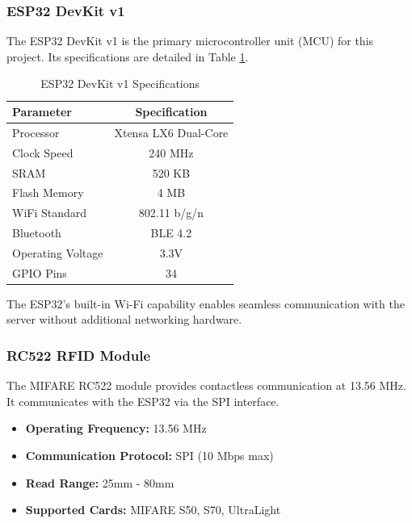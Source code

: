 \documentclass[12pt,a4paper]{article}
\begin{document}
\subsubsection{ESP32 DevKit v1}
The ESP32 DevKit v1 is the primary microcontroller unit (MCU) for this project. Its specifications are detailed in Table \ref{tab:esp32_specs}.

\begin{table}[htbp]
	\centering
	\caption{ESP32 DevKit v1 Specifications}
	\label{tab:esp32_specs}
	\begin{tabular}{|l|c|}
		\hline
		\textbf{Parameter} & \textbf{Specification} \\
		\hline
		Processor          & Xtensa LX6 Dual-Core   \\
		Clock Speed        & 240 MHz                \\
		SRAM               & 520 KB                 \\
		Flash Memory       & 4 MB                   \\
		WiFi Standard      & 802.11 b/g/n           \\
		Bluetooth          & BLE 4.2                \\
		Operating Voltage  & 3.3V                   \\
		GPIO Pins          & 34                     \\
		\hline
	\end{tabular}
\end{table}

The ESP32's built-in Wi-Fi capability enables seamless communication with the server without additional networking hardware.

\subsubsection{RC522 RFID Module}
The MIFARE RC522 module provides contactless communication at 13.56 MHz. It communicates with the ESP32 via the SPI interface.

\begin{itemize}
	\item \textbf{Operating Frequency:} 13.56 MHz
	\item \textbf{Communication Protocol:} SPI (10 Mbps max)
	\item \textbf{Read Range:} 25mm - 80mm
	\item \textbf{Supported Cards:} MIFARE S50, S70, UltraLight
\end{itemize}
\end{document}
